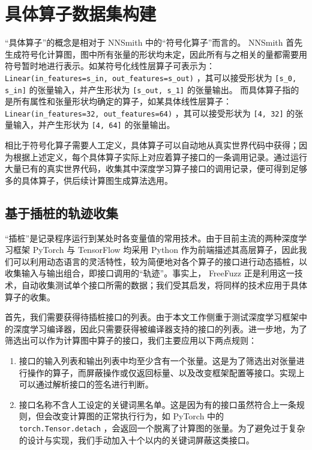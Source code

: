 \section{具体算子数据集构建}

“具体算子”的概念是相对于 NNSmith 中的“符号化算子”而言的。 NNSmith 首先生成符号化计算图，图中所有张量的形状均未定，因此所有与之相关的量都需要用符号暂时地进行表示。如某符号化线性层算子可表示为： \texttt{Linear(in\_features=s\_in, out\_features=s\_out)} ，其可以接受形状为 \texttt{[s\_0, s\_in]} 的张量输入，并产生形状为 \texttt{[s\_out, s\_1]} 的张量输出。
而具体算子指的是所有属性和张量形状均确定的算子，如某具体线性层算子： \texttt{Linear(in\_features=32, out\_features=64)} ，其可以接受形状为 \texttt{[4, 32]} 的张量输入，并产生形状为 \texttt{[4, 64]} 的张量输出。

相比于符号化算子需要人工定义，具体算子可以自动地从真实世界代码中获得；因为根据上述定义，每个具体算子实际上对应着算子接口的一条调用记录。通过运行大量已有的真实世界代码，收集其中深度学习算子接口的调用记录，便可得到足够多的具体算子，供后续计算图生成算法选用。

\subsection{基于插桩的轨迹收集}
\label{sec:collect}

“插桩”是记录程序运行到某处时各变量值的常用技术。由于目前主流的两种深度学习框架 PyTorch 与 TensorFlow 均采用 Python 作为前端描述其高层算子，因此我们可以利用动态语言的灵活特性，较为简便地对各个算子的接口进行动态插桩，以收集输入与输出组合，即接口调用的“轨迹”。事实上， FreeFuzz 正是利用这一技术，自动收集测试单个接口所需的数据；我们受其启发，将同样的技术应用于具体算子的收集。

首先，我们需要获得待插桩接口的列表。由于本文工作侧重于测试深度学习框架中的深度学习编译器，因此只需要获得被编译器支持的接口的列表。进一步地，为了筛选出可以作为计算图中算子的接口，我们主要应用以下两点规则：
\begin{enumerate}
    \item 接口的输入列表和输出列表中均至少含有一个张量。这是为了筛选出对张量进行操作的算子，而屏蔽操作或仅返回标量、以及改变框架配置等接口。实现上可以通过解析接口的签名进行判断。
    \item 接口名称不含人工设定的关键词黑名单。这是因为有的接口虽然符合上一条规则，但会改变计算图的正常执行行为，如 PyTorch 中的 \texttt{torch.Tensor.detach} ，会返回一个脱离了计算图的张量。为了避免过于复杂的设计与实现，我们手动加入十个以内的关键词屏蔽这类接口。
\end{enumerate}

